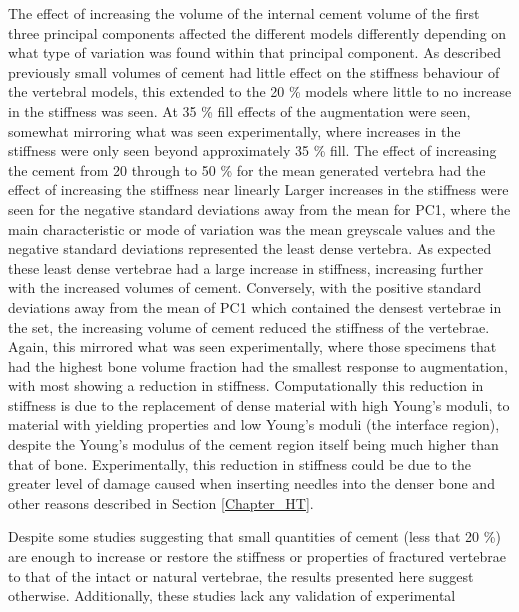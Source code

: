 The effect of increasing the volume of the internal cement volume of the first three principal components affected the different models differently depending on what type of variation was found within that principal component.
As described previously small volumes of cement had little effect on the stiffness behaviour of the vertebral models, this extended to the 20 \% models where little to no increase in the stiffness was seen.
At 35 \% fill effects of the augmentation were seen, somewhat mirroring what was seen experimentally, where increases in the stiffness were only seen beyond approximately 35 \% fill.
The effect of increasing the cement from 20 through to 50 \% for the mean generated vertebra had the effect of increasing the stiffness near linearly %
Larger increases in the stiffness were seen for the negative standard deviations away from the mean for PC1, where the main characteristic or mode of variation was the mean greyscale values and the negative standard deviations represented the least dense vertebra.
As expected these least dense vertebrae had a large increase in stiffness, increasing further with the increased volumes of cement.
Conversely, with the positive standard deviations away from the mean of PC1 which contained the densest vertebrae in the set, the increasing volume of cement reduced the stiffness of the vertebrae.
Again, this mirrored what was seen experimentally, where those specimens that had the highest bone volume fraction %
had the smallest response to augmentation, with most showing a reduction in stiffness.
Computationally this reduction in stiffness is due to the replacement of dense material with high Young's moduli, to material with yielding properties and low Young's moduli (the interface region), despite the Young's modulus of the cement region itself being much higher than that of bone.
Experimentally, this reduction in stiffness could be due to the greater level of damage caused when inserting needles into the denser bone and other reasons described in Section \ref{Chapter_HT}. %

Despite some studies suggesting that small quantities of cement (less that 20 \%) are enough to increase or restore the stiffness or properties of fractured vertebrae to that of the intact or natural vertebrae, the results presented here suggest otherwise.
Additionally, these studies lack any validation of experimental 

